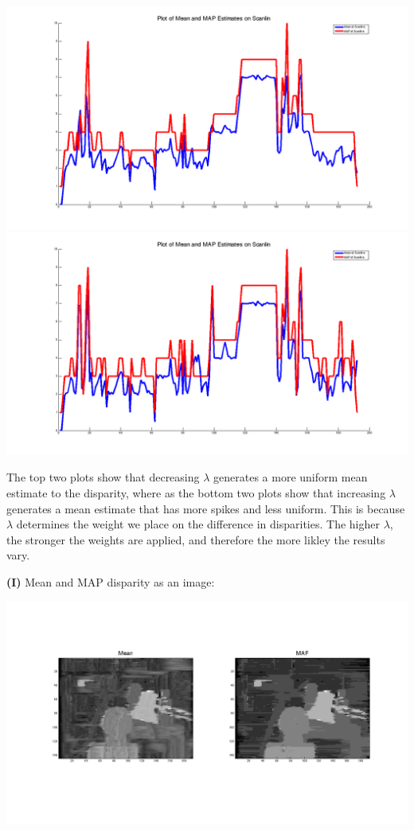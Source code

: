 \documentclass[12pt,twoside]{article}
\begin{document}
    \hspace{-40pt}
    \includegraphics[scale=.18]{5_1lambda5_b}
    \includegraphics[scale=.18]{5_1lambdaOne_b} \newline

The top two plots show that decreasing $\lambda$ generates a more uniform mean estimate to the disparity, where as the bottom two plots show that increasing $\lambda$ generates a mean estimate that has more spikes and less uniform.  This is because $\lambda$ determines the weight we place on the difference in disparities.  The higher $\lambda$, the stronger the weights are applied, and therefore the more likley the results vary.
\newline

\textbf{(I)} Mean and MAP disparity as an image:  
\newline

\hspace{-70pt}
    \includegraphics[scale=.4]{5_1g}
\end{document}
